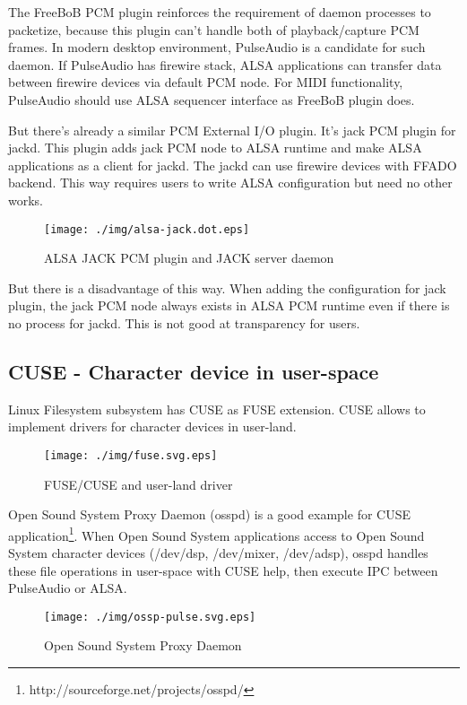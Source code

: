 \documentclass[onecolumn]{article}
\begin{document}
The FreeBoB PCM plugin reinforces the requirement of daemon processes to packetize, because this plugin can't handle both of playback/capture PCM frames. In modern desktop environment, PulseAudio is a candidate for such daemon. If PulseAudio has firewire stack, ALSA applications can transfer data between firewire devices via default PCM node. For MIDI functionality, PulseAudio should use ALSA sequencer interface as FreeBoB plugin does.

But there's already a similar PCM External I/O plugin. It's jack PCM plugin for jackd. This plugin adds jack PCM node to ALSA runtime and make ALSA applications as a client for jackd. The jackd can use firewire devices with FFADO backend. This way requires users to write ALSA configuration but need no other works.

\begin{figure}[H]
	\centering
	\texttt{[image: ./img/alsa-jack.dot.eps]}
	\caption{{ALSA JACK PCM plugin and JACK server daemon}}
	\label{alsa_jack}
\end{figure}

But there is a disadvantage of this way. When adding the configuration for jack plugin, the jack PCM node always exists in ALSA PCM runtime even if there is no process for jackd. This is not good at transparency for users.


\subsection{CUSE - Character device in user-space}
Linux Filesystem subsystem has CUSE as FUSE extension. CUSE allows to implement drivers for character devices in user-land.

\begin{figure}[H]
	\centering
	\texttt{[image: ./img/fuse.svg.eps]}
	\caption{{FUSE/CUSE and user-land driver}}
	\label{fuse}
\end{figure}

Open Sound System Proxy Daemon (osspd) is a good example for CUSE application\footnote{http://sourceforge.net/projects/osspd/}. When Open Sound System applications access to Open Sound System character devices (/dev/dsp, /dev/mixer, /dev/adsp), osspd handles these file operations in user-space with CUSE help, then execute IPC between PulseAudio or ALSA.

\begin{figure}[H]
	\centering
	\texttt{[image: ./img/ossp-pulse.svg.eps]}
	\caption{{Open Sound System Proxy Daemon}}
	\label{osspd_pulse}
\end{figure}
\end{document}
